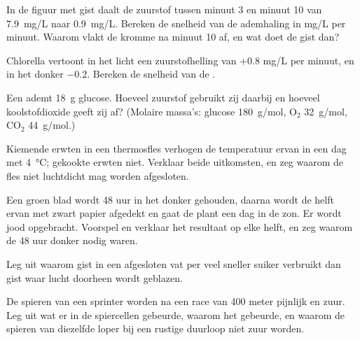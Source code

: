 \begin{exercise}[$\star\star$]\label{exo:g10:cell-metabolism:6}
In de figuur met gist daalt de zuurstof tussen minuut 3 en minuut 10 van
\qty{7.9}{mg/L} naar \qty{0.9}{mg/L}. Bereken de snelheid van de
ademhaling in \unit{mg/L} per minuut. Waarom vlakt de kromme na minuut
10 af, en wat doet de gist dan?
\end{exercise}

\begin{exercise}[$\star\star$]\label{exo:g10:cell-metabolism:7}
Chlorella vertoont in het licht een zuurstofhelling van $+0.8$
\unit{mg/L} per minuut, en in het donker $-0.2$. Bereken de snelheid van
de .
\end{exercise}

\begin{exercise}[$\star\star$]\label{exo:g10:cell-metabolism:8}
Een  ademt \qty{18}{g} glucose. Hoeveel zuurstof gebruikt zij daarbij
en hoeveel koolstofdioxide geeft zij af? (Molaire massa's: glucose
\qty{180}{g/mol}, $\mathrm{O_2}$ \qty{32}{g/mol}, $\mathrm{CO_2}$
\qty{44}{g/mol}.)
\end{exercise}

\begin{exercise}[$\star\star$]\label{exo:g10:cell-metabolism:9}
Kiemende erwten in een thermosfles verhogen de temperatuur ervan in een
dag met \qty{4}{\celsius}; gekookte erwten niet. Verklaar beide
uitkomsten, en zeg waarom de fles niet luchtdicht mag worden afgesloten.
\end{exercise}

\begin{exercise}[$\star\star$]\label{exo:g10:cell-metabolism:10}
Een groen blad wordt 48 uur in het donker gehouden, daarna wordt de
helft ervan met zwart papier afgedekt en gaat de plant een dag in de
zon. Er wordt jood opgebracht. Voorspel en verklaar het resultaat op
elke helft, en zeg waarom de 48 uur donker nodig waren.
\end{exercise}

\begin{exercise}[$\star\star$]\label{exo:g10:cell-metabolism:11}
Leg uit waarom gist in een afgesloten vat per  veel sneller suiker
verbruikt dan gist waar lucht doorheen wordt geblazen.
\end{exercise}

\begin{exercise}[$\star\star\star$]\label{exo:g10:cell-metabolism:12}
De spieren van een sprinter worden na een race van 400 meter pijnlijk en
zuur. Leg uit wat er in de spiercellen gebeurde, waarom het gebeurde, en
waarom de spieren van diezelfde loper bij een rustige duurloop niet zuur
worden.
\end{exercise}

